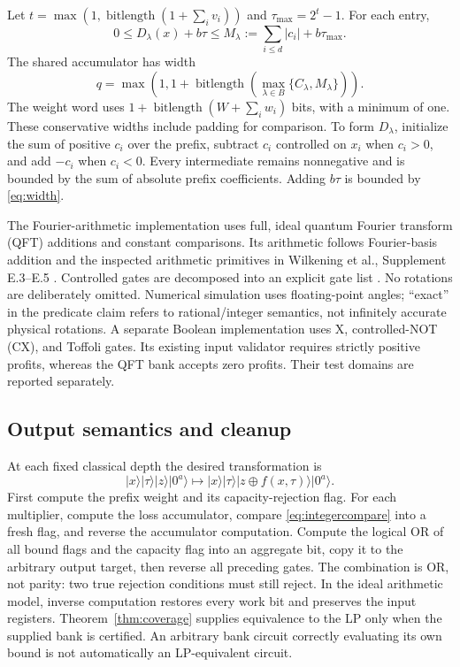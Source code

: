 \documentclass[referee,pdflatex,sn-mathphys-num]{sn-jnl}
\theoremstyle{thmstyleone}
\theoremstyle{thmstyletwo}
\begin{document}
Let $t=\max(1,\operatorname{bitlength}(1+\sum_i v_i))$ and $\tau_{\max}=2^t-1$. For each entry,
\begin{equation}\label{eq:width}
 0\leq D_\lambda(x)+b\tau\leq M_\lambda:=\sum_{i\leq d}|c_i|+b\tau_{\max}.
\end{equation}
The shared accumulator has width
\begin{equation}
 q=\max\left(1,1+\operatorname{bitlength}\left(\max_{\lambda\in B}\{C_\lambda,M_\lambda\}\right)\right).
\end{equation}
The weight word uses $1+\operatorname{bitlength}(W+\sum_iw_i)$ bits, with a minimum of one. These conservative widths include padding for comparison. To form $D_\lambda$, initialize the sum of positive $c_i$ over the prefix, subtract $c_i$ controlled on $x_i$ when $c_i>0$, and add $-c_i$ when $c_i<0$. Every intermediate remains nonnegative and is bounded by the sum of absolute prefix coefficients. Adding $b\tau$ is bounded by \eqref{eq:width}.

The Fourier-arithmetic implementation uses full, ideal quantum Fourier transform (QFT) additions and constant comparisons. Its arithmetic follows Fourier-basis addition \cite{draper2000} and the inspected arithmetic primitives in Wilkening et al., Supplement E.3--E.5 \cite{wilkening2025}. Controlled gates are decomposed into an explicit gate list \cite{barenco1995}. No rotations are deliberately omitted. Numerical simulation uses floating-point angles; ``exact'' in the predicate claim refers to rational/integer semantics, not infinitely accurate physical rotations. A separate Boolean implementation uses X, controlled-NOT (CX), and Toffoli gates. Its existing input validator requires strictly positive profits, whereas the QFT bank accepts zero profits. Their test domains are reported separately.

\subsection{Output semantics and cleanup}
At each fixed classical depth the desired transformation is
\begin{equation}\label{eq:unitary}
 |x\rangle|\tau\rangle|z\rangle|0^a\rangle
 \longmapsto |x\rangle|\tau\rangle|z\mathbin{\oplus}f(x,\tau)\rangle|0^a\rangle.
\end{equation}
First compute the prefix weight and its capacity-rejection flag. For each multiplier, compute the loss accumulator, compare \eqref{eq:integercompare} into a fresh flag, and reverse the accumulator computation. Compute the logical OR of all bound flags and the capacity flag into an aggregate bit, copy it to the arbitrary output target, then reverse all preceding gates. The combination is OR, not parity: two true rejection conditions must still reject. In the ideal arithmetic model, inverse computation restores every work bit and preserves the input registers. Theorem~\ref{thm:coverage} supplies equivalence to the LP only when the supplied bank is certified. An arbitrary bank circuit correctly evaluating its own bound is not automatically an LP-equivalent circuit.
\end{document}
